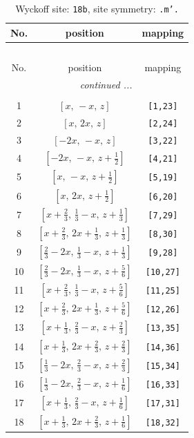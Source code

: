 \documentclass[fleqn,8pt]{jsarticle}
\begin{document}
\begin{longtable}{ccc}
\caption{Wyckoff site: {\tt 18b}, site symmetry: {\tt .m'.}}
 \\
 \hline \hline
No. & position & mapping \\ \hline \endfirsthead

\multicolumn{2}{l}{\tablename\ \thetable{}} \\
 \hline \hline
No. & position & mapping \\ \hline \endhead

 \hline \hline
\multicolumn{2}{r}{\footnotesize\it continued ...} \\ \endfoot

 \hline \hline
\multicolumn{2}{r}{} \\ \endlastfoot

1 & $\left[ x,\, - x,\, z \right]$ & {\tt [1,23]} \\ \hline
2 & $\left[ x,\, 2 x,\, z \right]$ & {\tt [2,24]} \\ \hline
3 & $\left[ - 2 x,\, - x,\, z \right]$ & {\tt [3,22]} \\ \hline
4 & $\left[ - 2 x,\, - x,\, z + \frac{1}{2} \right]$ & {\tt [4,21]} \\ \hline
5 & $\left[ x,\, - x,\, z + \frac{1}{2} \right]$ & {\tt [5,19]} \\ \hline
6 & $\left[ x,\, 2 x,\, z + \frac{1}{2} \right]$ & {\tt [6,20]} \\ \hline
7 & $\left[ x + \frac{2}{3},\, \frac{1}{3} - x,\, z + \frac{1}{3} \right]$ & {\tt [7,29]} \\ \hline
8 & $\left[ x + \frac{2}{3},\, 2 x + \frac{1}{3},\, z + \frac{1}{3} \right]$ & {\tt [8,30]} \\ \hline
9 & $\left[ \frac{2}{3} - 2 x,\, \frac{1}{3} - x,\, z + \frac{1}{3} \right]$ & {\tt [9,28]} \\ \hline
10 & $\left[ \frac{2}{3} - 2 x,\, \frac{1}{3} - x,\, z + \frac{5}{6} \right]$ & {\tt [10,27]} \\ \hline
11 & $\left[ x + \frac{2}{3},\, \frac{1}{3} - x,\, z + \frac{5}{6} \right]$ & {\tt [11,25]} \\ \hline
12 & $\left[ x + \frac{2}{3},\, 2 x + \frac{1}{3},\, z + \frac{5}{6} \right]$ & {\tt [12,26]} \\ \hline
13 & $\left[ x + \frac{1}{3},\, \frac{2}{3} - x,\, z + \frac{2}{3} \right]$ & {\tt [13,35]} \\ \hline
14 & $\left[ x + \frac{1}{3},\, 2 x + \frac{2}{3},\, z + \frac{2}{3} \right]$ & {\tt [14,36]} \\ \hline
15 & $\left[ \frac{1}{3} - 2 x,\, \frac{2}{3} - x,\, z + \frac{2}{3} \right]$ & {\tt [15,34]} \\ \hline
16 & $\left[ \frac{1}{3} - 2 x,\, \frac{2}{3} - x,\, z + \frac{1}{6} \right]$ & {\tt [16,33]} \\ \hline
17 & $\left[ x + \frac{1}{3},\, \frac{2}{3} - x,\, z + \frac{1}{6} \right]$ & {\tt [17,31]} \\ \hline
18 & $\left[ x + \frac{1}{3},\, 2 x + \frac{2}{3},\, z + \frac{1}{6} \right]$ & {\tt [18,32]} \\
\end{longtable}
\end{document}

